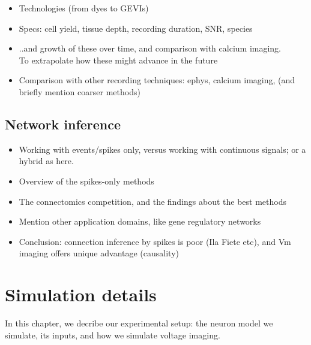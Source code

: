 \documentclass[a4paper, oneside, 11pt]{memoir}
\begin{document}
\begin{itemize}
    \item Technologies (from dyes to GEVIs)
    \item Specs: cell yield, tissue depth, recording duration, SNR, species
    \item ..and growth of these over time, and comparison with calcium imaging.\\
        To extrapolate how these might advance in the future
    \item Comparison with other recording techniques: ephys, calcium imaging, (and briefly mention coarser methods)
\end{itemize}


\section{Network inference}

\begin{itemize}
    \item Working with events/spikes only, versus working with continuous signals; or a hybrid as here.
    \item Overview of the spikes-only methods
    \item The connectomics competition, and the findings about the best methods
    \item Mention other application domains, like gene regulatory networks
    \item Conclusion: connection inference by spikes is poor (Ila Fiete etc), and Vm imaging offers unique advantage (causality)
\end{itemize}




\chapter{Simulation details}

In this chapter, we decribe our experimental setup: the neuron model we simulate, its inputs, and how we simulate voltage imaging.


\end{document}
